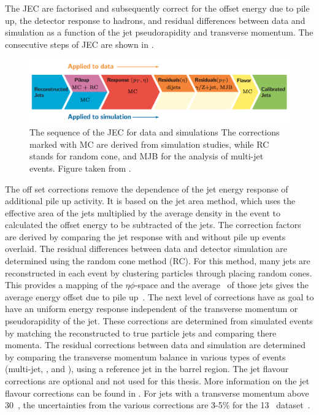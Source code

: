 The JEC are factorised and subsequently correct for the offset energy due to pile up, the detector response to hadrons, and residual differences between data and simulation as a function of the jet pseudorapidity and transverse momentum.  The consecutive steps of JEC are shown in . 
\begin{figure}[htbp]
	\centering
	\includegraphics[width=1.\linewidth]{4_EventRecoSelect/Figures/JES}
	\caption{The sequence of the JEC for data and simulations The corrections marked with MC are derived from simulation studies, while RC stands for random cone, and MJB for the analysis of multi-jet events. Figure taken from \cite{1748-0221-12-02-P02014}.}
	\label{fig:jes}
\end{figure}
The off set corrections remove the dependence of the jet energy response of additional pile up activity. It is based on the jet area method, which uses the effective area of the jets multiplied by the average density in the event to calculated the offset energy to be subtracted of the jets.  The correction factors are derived by comparing the jet response with and without pile up events overlaid. The residual differences between data and detector simulation are determined using the random cone method (RC). For this method, many jets are reconstructed in each event by clustering particles through placing  random cones. This provides a mapping of the $\eta\phi$-space and the average \pt\ of those jets gives the average energy offset due to pile up~\cite{1748-0221-12-02-P02014}. 
The next level of corrections have as goal to have an uniform energy response independent of the transverse momentum or pseudorapidity of the jet.  These corrections are determined from simulated events by matching the reconstructed to true particle jets and comparing there momenta. 
The residual corrections between data and simulation are determined by comparing the transverse momentum balance in various types of events (multi-jet, \Zjets, and \pjets), using a reference jet in the barrel region.  
The jet flavour corrections are optional and not used for this thesis. More information on the jet flavour corrections can be found in \cite{1748-0221-12-02-P02014}. For jets with a transverse momentum above 30~\GeV, the uncertainties from the various corrections are 3-5\% for the 13 \TeV\ dataset~\cite{CMS-DP-2016-020}.


